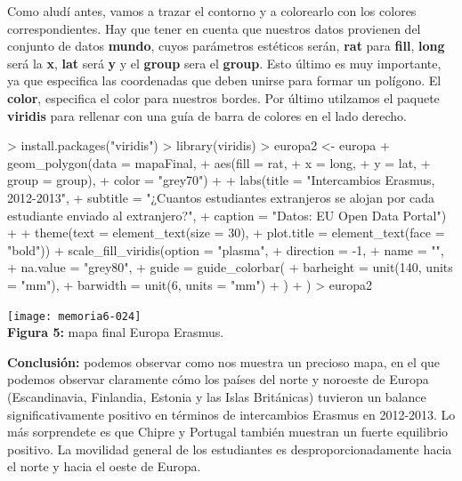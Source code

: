 \documentclass [a4paper] {article}
\begin{document}
Como aludí antes, vamos a trazar el contorno y a colorearlo con los colores correspondientes.
Hay que tener en cuenta que nuestros datos provienen del conjunto de datos \textbf{mundo}, cuyos
parámetros estéticos serán, \textbf{rat} para \textbf{fill}, \textbf{long} será la \textbf{x},
\textbf{lat} será \textbf{y} y el \textbf{group} sera el \textbf{group}. Esto último es muy
importante, ya que especifica las coordenadas que deben unirse para formar un polígono. El 
\textbf{color}, especifica el color para nuestros bordes. Por último utilzamos el paquete 
\textbf{viridis} para rellenar con una guía de barra de colores en el lado derecho.

\begin{center}
\begin{Schunk}
\begin{Sinput}
> install.packages("viridis")
> library(viridis)
> europa2 <- europa + geom_polygon(data = mapaFinal,
+                                  aes(fill = rat,
+                                      x = long,
+                                      y = lat,
+                                      group = group),
+                                  color = "grey70") +
+  labs(title = "Intercambios Erasmus, 2012-2013",
+       subtitle = "¿Cuantos estudiantes extranjeros se alojan por cada estudiante enviado al extranjero?",
+       caption = "Datos: EU Open Data Portal")  +
+  theme(text = element_text(size = 30),
+         plot.title = element_text(face = "bold")) +         scale_fill_viridis(option = "plasma",
+                    direction = -1,
+                    name = "",
+                    na.value = "grey80",
+                    guide = guide_colorbar(
+                    barheight = unit(140, units = "mm"),
+                    barwidth = unit(6, units = "mm")
+                                       )
+                                     )
> europa2
\end{Sinput}
\end{Schunk}
\texttt{[image: memoria6-024]}
\\\textbf{Figura 5:} mapa final Europa Erasmus.
\end{center}

\textbf{Conclusión:} podemos observar como nos muestra un precioso mapa, en el que podemos
observar claramente cómo los países del norte y noroeste de Europa (Escandinavia, Finlandia,
Estonia y las Islas Británicas) tuvieron un balance significativamente positivo en términos
de intercambios Erasmus en 2012-2013. Lo más sorprendete es que Chipre y Portugal también muestran
un fuerte equilibrio positivo. La movilidad general de los estudiantes es desproporcionadamente
hacia el norte y hacia el oeste de Europa.
\end{document}
